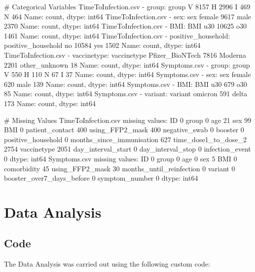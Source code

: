 \documentclass[11pt]{article}
\begin{document}
\begin{codeoutput}
\# Categorical Variables
TimeToInfection.csv - group:
group
V    8157
H    2996
I     469
N     464
Name: count, dtype: int64
TimeToInfection.csv - sex:
sex
female    9617
male      2370
Name: count, dtype: int64
TimeToInfection.csv - BMI:
BMI
u30    10625
o30     1461
Name: count, dtype: int64
TimeToInfection.csv - positive\_household:
positive\_household
no     10584
yes     1502
Name: count, dtype: int64
TimeToInfection.csv - vaccinetype:
vaccinetype
Pfizer\_BioNTech    7816
Moderna            2201
other\_unknown        18
Name: count, dtype: int64
Symptoms.csv - group:
group
V    550
H    110
N     67
I     37
Name: count, dtype: int64
Symptoms.csv - sex:
sex
female    620
male      139
Name: count, dtype: int64
Symptoms.csv - BMI:
BMI
u30    679
o30     85
Name: count, dtype: int64
Symptoms.csv - variant:
variant
omicron    591
delta      173
Name: count, dtype: int64

\# Missing Values
TimeToInfection.csv missing values: 
ID                              0
group                           0
age                            21
sex                            99
BMI                             0
patient\_contact               400
using\_FFP2\_mask               400
negative\_swab                   0
booster                         0
positive\_household              0
months\_since\_immunisation     627
time\_dose1\_to\_dose\_2         2754
vaccinetype                  2051
day\_interval\_start              0
day\_interval\_stop               0
infection\_event                 0
dtype: int64
Symptoms.csv missing values: 
ID                            0
group                         0
age                           0
sex                           5
BMI                           0
comorbidity                  45
using\_FFP2\_mask              30
months\_until\_reinfection      0
variant                       0
booster\_over7\_days\_before     0
symptom\_number                0
dtype: int64
\end{codeoutput}

\section{Data Analysis}
\subsection{{Code}}
The Data Analysis was carried out using the following custom code:
\end{document}
